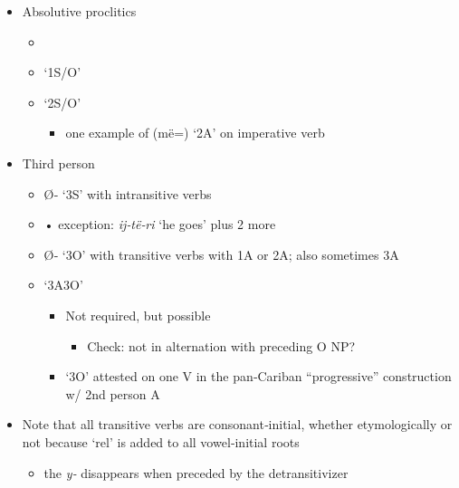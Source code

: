 \documentclass{memoir}
\begin{document}
\begin{itemize}
\tightlist
\item
  Absolutive proclitics

  \begin{itemize}
  \tightlist
  \item
  \item
     `1S/O'
  \item
     `2S/O'

    \begin{itemize}
    \tightlist
    \item
      one example of (më=) `2A' on imperative verb
    \end{itemize}
  \end{itemize}
\item
  Third person

  \begin{itemize}
  \tightlist
  \item
    Ø‑ `3S' with intransitive verbs
  \item
    • exception: \emph{ij‑të‑ri} `he goes' plus 2 more
  \item
    Ø‑ `3O' with transitive verbs with 1A or 2A; also sometimes 3A
  \item
     `3A3O'

    \begin{itemize}
    \tightlist
    \item
      Not required, but possible

      \begin{itemize}
      \tightlist
      \item
        Check: not in alternation with preceding O NP?
      \end{itemize}
    \item
       `3O' attested on one V in the pan‑Cariban
      ``progressive'' construction w/ 2nd person A
    \end{itemize}
  \end{itemize}
\item
  Note that all transitive verbs are consonant‑initial, whether
  etymologically or not because  `rel' is added to all
  vowel‑initial roots

  \begin{itemize}
  \tightlist
  \item
    the \emph{y‑} disappears when preceded by the detransitivizer
  \end{itemize}
\end{itemize}
\end{document}
